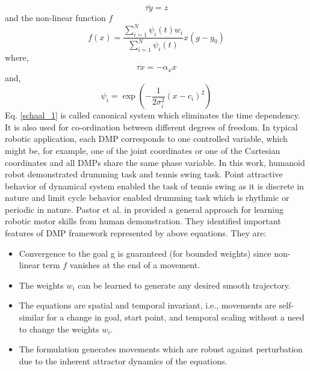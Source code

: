 \begin{equation}
\tau \dot{y} = z
\end{equation}
and the non-linear function $f$
\begin{equation}
f(x) = \frac{\sum_{i=1}^{N}\psi_{i}(t)w_{i}}{\sum_{i=1}^{N}\psi_{i}(t)}x(g - y_{0})
\end{equation}
where,
\begin{equation} \label{schaal_1}
\tau \dot{x} = -\alpha_{x}x
\end{equation}
and,
\begin{equation}
\psi_{i} = \exp(-{\frac{1}{2\sigma_{i}^{2}}(x - c_{i})^{2}})
\end{equation}
Eq. \ref{schaal_1} is called canonical system which eliminates the time dependency. It is also used for co-ordination between different degrees of freedom. In typical robotic application, each DMP corresponds to one controlled variable, which might be, for example, one of the joint coordinates or one of the Cartesian coordinates and all DMPs share the same phase variable. In this work, humanoid robot demonstrated drumming task and tennis swing task. Point attractive behavior of dynamical system enabled the task of tennis swing as it is discrete in nature and limit cycle behavior enabled drumming task which is rhythmic or periodic in nature.   
\newline
Pastor et al. in \cite{pastor2009learning} provided a general approach for learning robotic motor skills from human demonstration. They identified important features of DMP framework represented by above equations. They are:
\begin{itemize}
	\item Convergence to the goal g is guaranteed (for bounded weights) since non-linear term $f$ vanishes at the end of a movement.
	\item The weights $w_{i}$ can be learned to generate any desired smooth trajectory.
	\item The equations are spatial and temporal invariant, i.e., movements are self-similar for a change in goal, start point, and temporal scaling without a need to change the weights $w_{i}$.
	\item The formulation generates movements which are robust against perturbation due to the inherent attractor dynamics of the equations.
\end{itemize}
